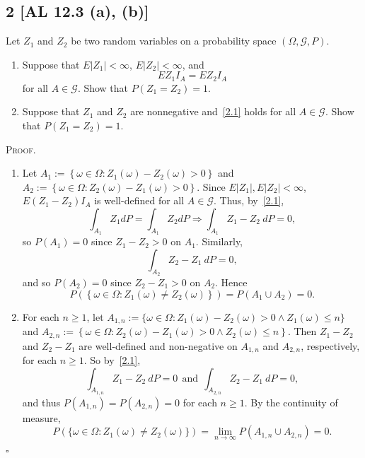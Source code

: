 \documentclass[12pt]{article}
\newcounter{ProofCounter}
\newenvironment{Proof}{\stepcounter{ProofCounter}\textsc{Proof.}}{\hfill$\square$}
\begin{document}
\subsection*{2 [AL 12.3 (a), (b)]}
\begin{tcolorbox}
  Let $Z_1$ and $Z_2$ be two random variables on a probability space $(\Omega, \mathcal{G}, P)$.
  \begin{enumerate}[label = (\alph*)]
    \item Suppose that $E|Z_1| < \infty$, $E|Z_2| < \infty$, and 
      \begin{equation}
        EZ_1 I_A = EZ_2 I_A 
        \label{2.1}
      \end{equation}
      for all $A \in \mathcal{G}$. Show that $P(Z_1 = Z_2) = 1$.
    \item Suppose that $Z_1$ and $Z_2$ are nonnegative and~\eqref{2.1} holds for all $A \in \mathcal{G}$. Show that $P(Z_1 = Z_2) = 1$.
  \end{enumerate}
\end{tcolorbox}
\begin{Proof}
  \begin{enumerate}[label = (\alph*)]
    \item Let $A_1 := \left\{ \omega \in \Omega : Z_1(\omega) - Z_2(\omega) > 0 \right\}$ and $A_2 := \left\{ \omega \in \Omega : Z_2(\omega) - Z_1(\omega) > 0 \right\}$. Since
      $E|Z_1|, E|Z_2| < \infty$, $E(Z_1 - Z_2)I_{A}$ is well-defined for all $A \in \mathcal{G}$. Thus, by~\eqref{2.1},
      \[ \int_{A_1}Z_1 dP = \int_{A_1}Z_2 dP \Rightarrow \int_{A_1}Z_1 - Z_2\ dP = 0, \]
      so $P(A_1) = 0$ since $Z_1 - Z_2 > 0$ on $A_1$. Similarly, 
      \[ \int_{A_2}Z_2 - Z_1\ dP = 0, \]
      and so $P(A_2) = 0$ since $Z_2 - Z_1 > 0$ on $A_2$. Hence 
      \[
        P(\left\{ \omega \in \Omega : Z_1(\omega) \neq Z_2(\omega) \right\}) = P(A_1 \cup A_2) = 0. 
      \]
    \item For each $n\geq 1$, let $A_{1,n} := \{\omega \in \Omega : Z_1(\omega) - Z_2(\omega) > 0 \wedge Z_1(\omega) \leq n\}$ and $A_{2,n} := \left\{
      \omega \in \Omega : Z_2(\omega) - Z_1(\omega) > 0 \wedge Z_2(\omega) \leq n \right\}$. Then $Z_1 - Z_2$ and $Z_2 - Z_1$ are well-defined and
      non-negative on $A_{1,n}$ and $A_{2,n}$, respectively, for each $n\geq 1$. So by~\eqref{2.1},
      \[ \int_{A_{1,n}}Z_1 - Z_2 \ dP = 0 \ \ \text{and} \ \ \int_{A_{2,n}}Z_{2} - Z_{1}\ dP = 0, \]
      and thus $P(A_{1,n}) = P(A_{2,n}) = 0$ for each $n\geq 1$. By the continuity of measure,
      \[ P(\{\omega \in \Omega : Z_1(\omega) \neq Z_2(\omega)\}) = \lim_{n\rightarrow\infty}P(A_{1,n}\cup A_{2,n}) = 0. \]
  \end{enumerate}
\end{Proof}
\end{document}

